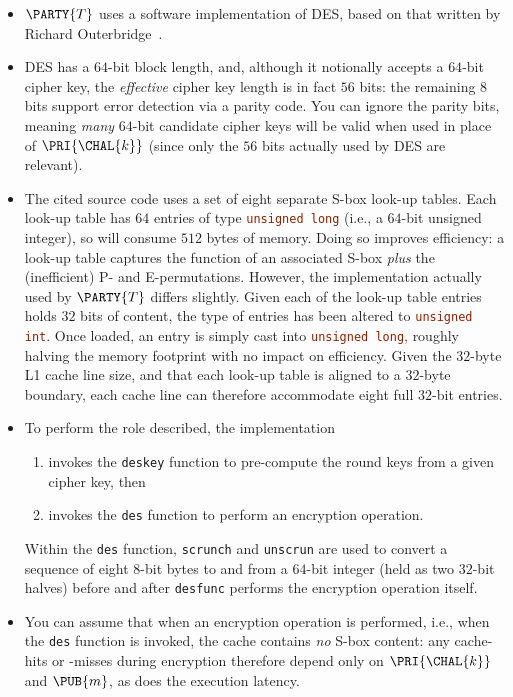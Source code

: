 \begin{itemize}
\item $\PARTY{T}$ uses a software implementation of DES, based on that
      written by Richard Outerbridge~\cite[Part V]{SCALE:Schneier:06}.
\item DES has a $64$-bit block length, and, although it notionally accepts 
      a $64$-bit cipher key, the {\em effective} cipher key length is in
      fact $56$ bits: the remaining $8$ bits support error detection via 
      a parity code.  You can ignore the parity bits, meaning {\em many}
      $64$-bit candidate cipher keys will be valid when used in place of 
      $\PRI{\CHAL{k}}$ (since only the $56$ bits actually used by DES are 
      relevant).
\item The cited source code uses a set of eight separate S-box look-up 
      tables.  Each look-up table has $64$ entries of type 
      \lstinline[language=C]{unsigned long} 
      (i.e., a $64$-bit unsigned integer), so will consume $512$ bytes 
      of memory.  Doing so improves efficiency: a look-up table captures 
      the function of an associated S-box {\em plus} the (inefficient) 
      P- and E-permutations.  However, the implementation actually used 
      by $\PARTY{T}$ differs slightly.  Given each of the look-up table 
      entries holds $32$ bits of content, the type of entries has been 
      altered to 
      \lstinline[language=C]{unsigned int}. 
      Once loaded, an entry is simply cast into 
      \lstinline[language=C]{unsigned long},
      roughly halving the memory footprint with no impact on efficiency.
      Given the $32$-byte L1 cache line size, and that each look-up table 
      is aligned to a $32$-byte boundary, each cache line can therefore 
      accommodate eight full $32$-bit entries.
\item To perform the role described, the implementation

      \begin{enumerate}
      \item invokes the \lstinline[language=C]{deskey} function
            to pre-compute the round keys from a given cipher key,
            then
      \item invokes the \lstinline[language=C]{des}    function
            to perform an encryption operation.
      \end{enumerate}

      \noindent
      Within the 
      \lstinline[language=C]{des}
      function, 
      \lstinline[language=C]{scrunch} and \lstinline[language=C]{unscrun}
      are used to convert a sequence of eight $8$-bit bytes to and from a
      $64$-bit integer (held as two $32$-bit halves) before and after 
      \lstinline[language=C]{desfunc}
      performs the encryption operation itself.
\item You can assume that when an encryption operation is performed, i.e.,
      when the
      \lstinline[language=C]{des}
      function is invoked, the cache contains {\em no} S-box content: any
      cache-hits or -misses during encryption therefore depend only on 
      $\PRI{\CHAL{k}}$ and $\PUB{m}$, as does the execution latency.
\end{itemize}

